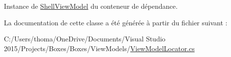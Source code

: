 Instance de \hyperlink{class_boxes_1_1_view_models_1_1_shell_view_model}{Shell\+View\+Model} du conteneur de dépendance. 



La documentation de cette classe a été générée à partir du fichier suivant \+:\begin{DoxyCompactItemize}
\item 
C\+:/\+Users/thoma/\+One\+Drive/\+Documents/\+Visual Studio 2015/\+Projects/\+Boxes/\+Boxes/\+View\+Models/\hyperlink{_view_model_locator_8cs}{View\+Model\+Locator.\+cs}\end{DoxyCompactItemize}
